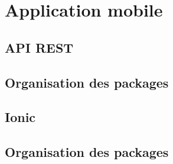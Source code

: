 \chapter{Application mobile}
	\section{API REST}
	\section{Organisation des packages}

	\section{Ionic}
	\section{Organisation des packages}
